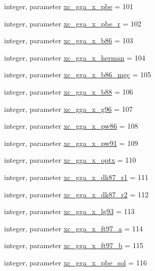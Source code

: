 \begin{DoxyCompactItemize}
integer, parameter \hyperlink{classlibxc__funcs__m_ab9658d43ef44bb4ff2b9f308e741ab53}{xc\-\_\-gga\-\_\-x\-\_\-pbe} = 101
\item 
integer, parameter \hyperlink{classlibxc__funcs__m_ad32b9aeb7293da870cc16af08eda3d49}{xc\-\_\-gga\-\_\-x\-\_\-pbe\-\_\-r} = 102
\item 
integer, parameter \hyperlink{classlibxc__funcs__m_a60c55f78de395edfab27a779122a4dd8}{xc\-\_\-gga\-\_\-x\-\_\-b86} = 103
\item 
integer, parameter \hyperlink{classlibxc__funcs__m_a0bf11a39b781e3559b3f4ba9a47c8b61}{xc\-\_\-gga\-\_\-x\-\_\-herman} = 104
\item 
integer, parameter \hyperlink{classlibxc__funcs__m_a75c66bb6804ccec4e91fb33ebf964d8e}{xc\-\_\-gga\-\_\-x\-\_\-b86\-\_\-mgc} = 105
\item 
integer, parameter \hyperlink{classlibxc__funcs__m_a153ff5fa83a1c87317d79a17f5cf3678}{xc\-\_\-gga\-\_\-x\-\_\-b88} = 106
\item 
integer, parameter \hyperlink{classlibxc__funcs__m_a09b4f56ddfb4ef5e799be6df6e6ff832}{xc\-\_\-gga\-\_\-x\-\_\-g96} = 107
\item 
integer, parameter \hyperlink{classlibxc__funcs__m_aa793fe506e0f50d0590901ba3a6811c8}{xc\-\_\-gga\-\_\-x\-\_\-pw86} = 108
\item 
integer, parameter \hyperlink{classlibxc__funcs__m_a2099bc3948f36526a1792851c61e906a}{xc\-\_\-gga\-\_\-x\-\_\-pw91} = 109
\item 
integer, parameter \hyperlink{classlibxc__funcs__m_a5dae05e7bd289ca5703105670c5dc7c6}{xc\-\_\-gga\-\_\-x\-\_\-optx} = 110
\item 
integer, parameter \hyperlink{classlibxc__funcs__m_a387f7653badeed8326fa249baa785299}{xc\-\_\-gga\-\_\-x\-\_\-dk87\-\_\-r1} = 111
\item 
integer, parameter \hyperlink{classlibxc__funcs__m_a08de938eedfdb373bd9c63259478c7ac}{xc\-\_\-gga\-\_\-x\-\_\-dk87\-\_\-r2} = 112
\item 
integer, parameter \hyperlink{classlibxc__funcs__m_af997b959b350a8c6a203ca82270a5068}{xc\-\_\-gga\-\_\-x\-\_\-lg93} = 113
\item 
integer, parameter \hyperlink{classlibxc__funcs__m_a7af33a6856ce6d1e9608936f94409eb5}{xc\-\_\-gga\-\_\-x\-\_\-ft97\-\_\-a} = 114
\item 
integer, parameter \hyperlink{classlibxc__funcs__m_acfb4c90e58517b9b273a29a7752f07db}{xc\-\_\-gga\-\_\-x\-\_\-ft97\-\_\-b} = 115
\item 
integer, parameter \hyperlink{classlibxc__funcs__m_a46b4224e51205ce3054b89362eff8e44}{xc\-\_\-gga\-\_\-x\-\_\-pbe\-\_\-sol} = 116

\end{DoxyCompactItemize}
